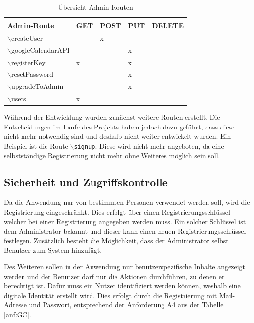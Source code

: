 \begin{table}[h]
	\centering
	\renewcommand*{\arraystretch}{1.25}
	\begin{tabular}{|l|P{2cm}|P{2cm}|P{2cm}|P{2cm}|}
		\hline &&\\[-0.6em]
		\textbf{Admin-Route} & \textbf{GET} & \textbf{POST} & \textbf{PUT} & \textbf{DELETE} \\ \hline
		$\backslash$createUser & & x & & \\ \hline
		$\backslash$googleCalendarAPI & & & x & \\ \hline
		$\backslash$registerKey & x & & x & \\ \hline
		$\backslash$resetPassword & & & x & \\ \hline
		$\backslash$upgradeToAdmin & & & x & \\ \hline
		$\backslash$users & x & & & \\ \hline
	\end{tabular}
	\captionsetup{format=hang}
	\caption{\label{tab:adminrouten}Übersicht Admin-Routen \\}
\end{table}

Während der Entwicklung wurden zunächst weitere Routen erstellt.
Die Entscheidungen im Laufe des Projekts haben jedoch dazu geführt, dass diese nicht mehr notwendig sind und deshalb nicht weiter entwickelt wurden.
Ein Beispiel ist die Route \texttt{$\backslash$signup}.
Diese wird nicht mehr angeboten, da eine selbstständige Registrierung nicht mehr ohne Weiteres möglich sein soll.

\subsection{Sicherheit und Zugriffskontrolle}
Da die Anwendung nur von bestimmten Personen verwendet werden soll, wird die Registrierung eingeschränkt.
Dies erfolgt über einen Registrierungsschlüssel, welcher bei einer Registrierung angegeben werden muss.
Ein solcher Schlüssel ist dem Administrator bekannt und dieser kann einen neuen Registrierungsschlüssel festlegen.
Zusätzlich besteht die Möglichkeit, dass der Administrator selbst Benutzer zum System hinzufügt. 

Des Weiteren sollen in der Anwendung nur benutzerspezifische Inhalte angezeigt werden und der Benutzer darf nur die Aktionen durchführen, zu denen er berechtigt ist.
Dafür muss ein Nutzer identifiziert werden können, weshalb eine digitale Identität erstellt wird.
Dies erfolgt durch die Registrierung mit Mail-Adresse und Passwort, entsprechend der Anforderung A4 aus der Tabelle \ref{anf:GC}.

